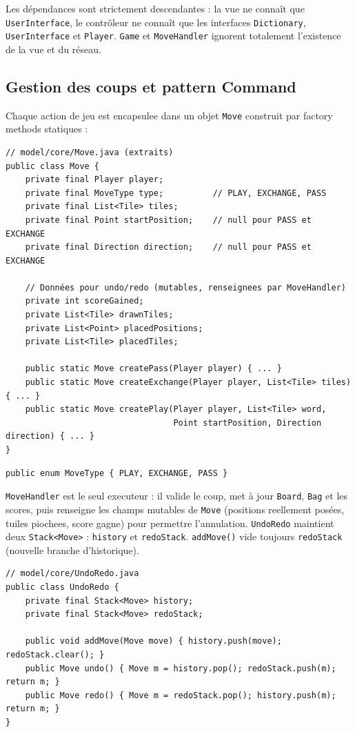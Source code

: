 \documentclass[a4paper]{article}
\begin{document}
Les dépendances sont strictement descendantes : la vue ne connaît que \texttt{UserInterface}, le contrôleur ne connaît que les interfaces \texttt{Dictionary}, \texttt{UserInterface} et \texttt{Player}. \texttt{Game} et \texttt{MoveHandler} ignorent totalement l'existence de la vue et du réseau.

\subsection{Gestion des coups et pattern Command}
Chaque action de jeu est encapsulee dans un objet \texttt{Move} construit par factory methods statiques :

\begin{verbatim}
// model/core/Move.java (extraits)
public class Move {
    private final Player player;
    private final MoveType type;          // PLAY, EXCHANGE, PASS
    private final List<Tile> tiles;
    private final Point startPosition;    // null pour PASS et EXCHANGE
    private final Direction direction;    // null pour PASS et EXCHANGE

    // Données pour undo/redo (mutables, renseignees par MoveHandler)
    private int scoreGained;
    private List<Tile> drawnTiles;
    private List<Point> placedPositions;
    private List<Tile> placedTiles;

    public static Move createPass(Player player) { ... }
    public static Move createExchange(Player player, List<Tile> tiles) { ... }
    public static Move createPlay(Player player, List<Tile> word,
                                  Point startPosition, Direction direction) { ... }
}
\end{verbatim}

\begin{verbatim}
public enum MoveType { PLAY, EXCHANGE, PASS }
\end{verbatim}

\texttt{MoveHandler} est le seul executeur : il valide le coup, met à jour \texttt{Board}, \texttt{Bag} et les scores, puis renseigne les champs mutables de \texttt{Move} (positions reellement posées, tuiles piochees, score gagne) pour permettre l'annulation. \texttt{UndoRedo} maintient deux \texttt{Stack<Move>} : \texttt{history} et \texttt{redoStack}. \texttt{addMove()} vide toujours \texttt{redoStack} (nouvelle branche d'historique).

\begin{verbatim}
// model/core/UndoRedo.java
public class UndoRedo {
    private final Stack<Move> history;
    private final Stack<Move> redoStack;

    public void addMove(Move move) { history.push(move); redoStack.clear(); }
    public Move undo() { Move m = history.pop(); redoStack.push(m); return m; }
    public Move redo() { Move m = redoStack.pop(); history.push(m); return m; }
}
\end{verbatim}
\end{document}
